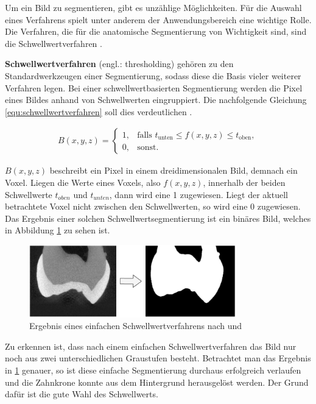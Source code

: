 Um ein Bild zu segmentieren, gibt es unzählige Möglichkeiten. Für die Auswahl
eines Verfahrens spielt unter anderem der Anwendungsbereich eine wichtige Rolle.
Die Verfahren, die für die anatomische Segmentierung von Wichtigkeit sind, sind die
Schwellwertverfahren \citep[vgl.][S.~361]{lehmann2013bildverarbeitung}.

\pagebreak

\textbf{Schwellwertverfahren} (engl.: thresholding) gehören zu den
Standardwerkzeugen einer Segmentierung, sodass diese die Basis vieler weiterer Verfahren
legen. Bei einer schwellwertbasierten Segmentierung werden die Pixel eines
Bildes anhand von Schwellwerten eingruppiert. Die nachfolgende Gleichung \ref{equ:schwellwertverfahren}
soll dies verdeutlichen \citep[vgl.][S.~96]{handels2000}.

\begin{align}
	\label{equ:schwellwertverfahren}B(x, y, z) = \begin{cases}1,&\text{falls }t_{\text{unten}}\leq f(x, y, z) \leq t_{\text{oben}}, \\ 0,&\text{sonst}.\end{cases}
\end{align}

$B(x, y, z)$ beschreibt ein Pixel in einem dreidimensionalen Bild, demnach ein
Voxel. Liegen die Werte eines Voxels, also $f(x, y, z)$, innerhalb der beiden Schwellwerte
$t_{oben}$ und $t_{unten}$, dann wird eine 1 zugewiesen. Liegt der aktuell betrachtete
Voxel nicht zwischen den Schwellwerten, so wird eine 0 zugewiesen. Das Ergebnis einer
solchen Schwellwertsegmentierung ist ein binäres Bild, welches in Abbildung
\ref{fig:binäres_schwellwertverfahren} zu sehen ist.

\begin{figure}[h]
	\centering
	\includegraphics[width=0.8\textwidth]{img/beispiel_schwellwertverfahren.png}
	\caption{Ergebnis eines einfachen Schwellwertverfahrens nach \citet{heck2024} und
	\citet{hoffmann2020}}
	\label{fig:binäres_schwellwertverfahren}
\end{figure}

Zu erkennen ist, dass nach einem einfachen Schwellwertverfahren das Bild nur
noch aus zwei unterschiedlichen Graustufen besteht. Betrachtet man das Ergebnis in
\ref{fig:binäres_schwellwertverfahren} genauer, so ist diese einfache
Segmentierung durchaus erfolgreich verlaufen und die Zahnkrone konnte aus dem
Hintergrund herausgelöst werden. Der Grund dafür ist die gute Wahl des Schwellwerts.

